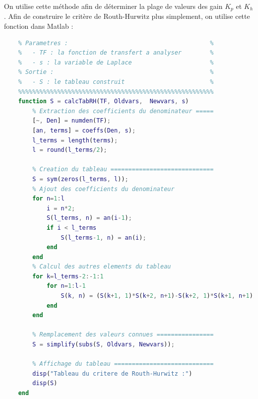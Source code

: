 \documentclass[a4paper,12pt]{article}
\begin{document}
    On utilise cette méthode afin de déterminer la plage de valeurs des gain $K_p$ et $K_h$. Afin de construire le critère de Routh-Hurwitz plus simplement, on utilise cette fonction dans Matlab : \\
    \begin{lstlisting}[label={code:fctCritRH}, caption={Fonction Matlab génération du critère de Routh-Hurwitz}, language=Matlab]
    %%%%%%%%%%%%%%%%%%%%%%%%%%%%%%%%%%%%%%%%%%%%%%%%%%%%%%%
    % Parametres :                                        %
    %   - TF : la fonction de transfert a analyser        %
    %   - s : la variable de Laplace                      %
    % Sortie :                                            %
    %   - S : le tableau construit                        %
    %%%%%%%%%%%%%%%%%%%%%%%%%%%%%%%%%%%%%%%%%%%%%%%%%%%%%%%
    function S = calcTabRH(TF, Oldvars,  Newvars, s)
        % Extraction des coefficients du denominateur =====
        [~, Den] = numden(TF);
        [an, terms] = coeffs(Den, s);
        l_terms = length(terms);
        l = round(l_terms/2);

        % Creation du tableau =============================
        S = sym(zeros(l_terms, l));
        % Ajout des coefficients du denominateur
        for n=1:l
            i = n*2;
            S(l_terms, n) = an(i-1);
            if i < l_terms
                S(l_terms-1, n) = an(i);
            end
        end
        % Calcul des autres elements du tableau
        for k=l_terms-2:-1:1
            for n=1:l-1
                S(k, n) = (S(k+1, 1)*S(k+2, n+1)-S(k+2, 1)*S(k+1, n+1))/S(k+1, 1);
            end
        end

        % Remplacement des valeurs connues ================
        S = simplify(subs(S, Oldvars, Newvars));

        % Affichage du tableau ============================
        disp("Tableau du critere de Routh-Hurwitz :")
        disp(S)
    end
    \end{lstlisting}
    
\end{document}
